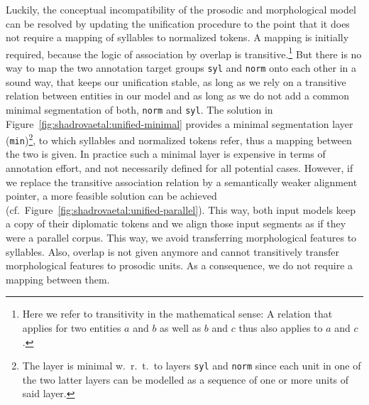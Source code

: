 \documentclass[output=paper,colorlinks,citecolor=brown]{langscibook}
\begin{document}
\begin{sloppypar}
Luckily, the conceptual incompatibility of the prosodic and morphological model can be resolved by updating the unification procedure to the point that it does not require a mapping of syllables to normalized tokens.
A mapping is initially required, because the logic of association by overlap is transitive.\footnote{Here we refer to transitivity in the mathematical sense: A relation that applies for two entities $a$ and $b$ as well as $b$ and $c$ thus also applies to $a$ and $c$.}
But there is no way to map the two annotation target groups \texttt{syl} and \texttt{norm} onto each other in a sound way, that keeps our unification stable, as long as we rely on a transitive relation between entities in our model and as long as we do not add a common minimal segmentation of both, \texttt{norm} and \texttt{syl}.
The solution in Figure~\ref{fig:shadrovaetal:unified-minimal} provides a minimal segmentation layer (\texttt{min})\footnote{The layer is minimal w.~r.~t.\ to layers \texttt{syl} and \texttt{norm} since each unit in one of the two latter layers can be modelled as a sequence of one or more units of said layer.}, to which syllables and normalized tokens refer, thus a mapping between the two is given. In practice such a minimal layer is expensive in terms of annotation effort, and not necessarily defined for all potential cases.
However, if we replace the transitive association relation by a semantically weaker alignment pointer, a more feasible solution can be achieved (cf.~Figure~\ref{fig:shadrovaetal:unified-parallel}). This way, both input models keep a copy of their diplomatic tokens and we align those input segments as if they were a parallel corpus. This way, we avoid transferring morphological features to syllables. Also, overlap is not given anymore and cannot transitively transfer morphological features to prosodic units. As a consequence, we do not require a mapping between them.
\end{sloppypar}
\end{document}

